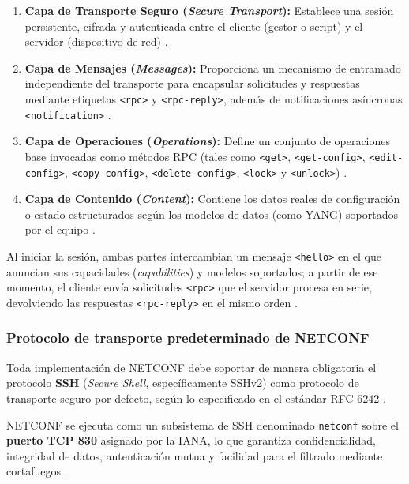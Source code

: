 \documentclass[12pt,a4paper]{article}
\begin{document}
\begin{enumerate}
    \item \textbf{Capa de Transporte Seguro (\textit{Secure Transport}):} Establece una sesión persistente, cifrada y autenticada entre el cliente (gestor o script) y el servidor (dispositivo de red) \parencite{enns2011rfc6241}.
    \item \textbf{Capa de Mensajes (\textit{Messages}):} Proporciona un mecanismo de entramado independiente del transporte para encapsular solicitudes y respuestas mediante etiquetas \texttt{<rpc>} y \texttt{<rpc-reply>}, además de notificaciones asíncronas \texttt{<notification>} \parencite{enns2011rfc6241}.
    \item \textbf{Capa de Operaciones (\textit{Operations}):} Define un conjunto de operaciones base invocadas como métodos RPC (tales como \texttt{<get>}, \texttt{<get-config>}, \texttt{<edit-config>}, \texttt{<copy-config>}, \texttt{<delete-config>}, \texttt{<lock>} y \texttt{<unlock>}) \parencite{enns2011rfc6241}.
    \item \textbf{Capa de Contenido (\textit{Content}):} Contiene los datos reales de configuración o estado estructurados según los modelos de datos (como YANG) soportados por el equipo \parencite{enns2011rfc6241}.
\end{enumerate}

Al iniciar la sesión, ambas partes intercambian un mensaje \texttt{<hello>} en el que anuncian sus capacidades (\textit{capabilities}) y modelos soportados; a partir de ese momento, el cliente envía solicitudes \texttt{<rpc>} que el servidor procesa en serie, devolviendo las respuestas \texttt{<rpc-reply>} en el mismo orden \parencite{enns2011rfc6241, wasserman2011rfc6242}.

\subsubsection{Protocolo de transporte predeterminado de NETCONF}

Toda implementación de NETCONF debe soportar de manera obligatoria el protocolo \textbf{SSH} (\textit{Secure Shell}, específicamente SSHv2) como protocolo de transporte seguro por defecto, según lo especificado en el estándar RFC 6242 \parencite{enns2011rfc6241, wasserman2011rfc6242}.

NETCONF se ejecuta como un subsistema de SSH denominado \texttt{netconf} sobre el \textbf{puerto TCP 830} asignado por la IANA, lo que garantiza confidencialidad, integridad de datos, autenticación mutua y facilidad para el filtrado mediante cortafuegos \parencite{wasserman2011rfc6242}.
\end{document}
